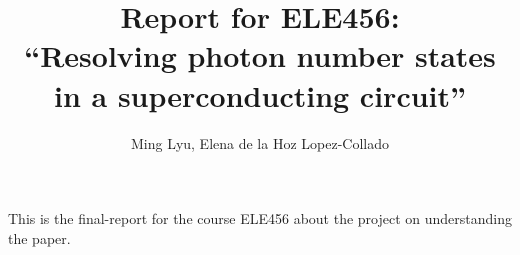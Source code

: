 \documentclass[11pt, notitlepage,nofootinbib]{revtex4-1}
\begin{document}
\title[Report for ELE456]{Report for ELE456: \\
``Resolving photon number states in a superconducting circuit''}
\author{Ming Lyu, Elena de la Hoz Lopez-Collado}
\maketitle
This is the final-report for the course ELE456 about the project on understanding 
the paper\cite{schuster2007resolving}. 



\end{document}

